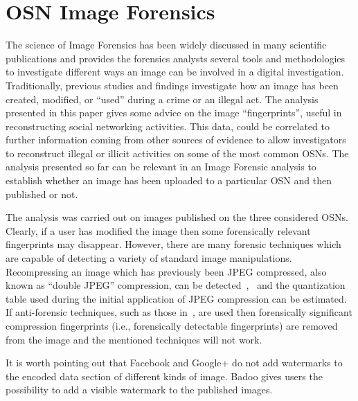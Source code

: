 \documentclass[10pt, conference]{IEEEtran}
\begin{document}
\section{OSN Image Forensics}
\label{sec5}
The science of Image Forensics has been widely discussed in many scientific publications and  provides the forensics analysts several tools and methodologies to investigate different ways an image can be involved in a digital investigation. Traditionally, previous studies and findings investigate how an image has been created, modified, or ``used'' during a crime or an illegal act.
The analysis presented in this paper gives some advice on the image ``fingerprints'', useful in reconstructing social networking activities. This data, could be correlated to further information coming from other sources of evidence to allow investigators to reconstruct illegal or illicit activities on some of the most common OSNs.
The analysis presented so far can be relevant in an Image Forensic analysis to establish whether
an image has been uploaded to a particular OSN and then published or not.

The analysis was carried out on images published on the three considered OSNs.
Clearly, if a user has modified the image then some forensically relevant fingerprints may disappear. However, there are many forensic techniques which are capable of detecting a variety of standard image manipulations. Recompressing an image which has previously been JPEG compressed, also known as ``double JPEG'' compression, can be detected~\cite{PopescuF04},~\cite{PevnyF08} and the quantization table used during the initial application of JPEG compression can be estimated. If anti-forensic techniques, such as those in~\cite{tifs2011}, are used then forensically significant compression fingerprints (i.e., forensically detectable fingerprints) are removed from the image and the mentioned techniques will not work.

It is worth pointing out that Facebook and Google+ do not add watermarks to the encoded data section of different kinds of image. Badoo gives users the possibility to add a visible watermark
to the published images.

\end{document}
